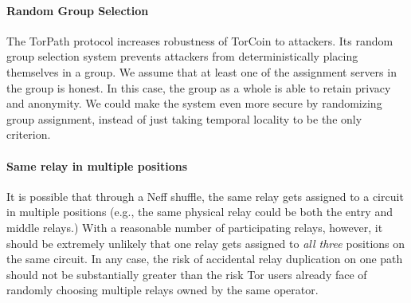 {\paragraph{Random Group Selection} The TorPath protocol increases
robustness of TorCoin to attackers. Its random group selection system prevents
attackers from deterministically placing themselves in a group. We assume that
at least one of the assignment servers in the group is honest. In this case,
the group as a whole is able to retain privacy and anonymity. We could make
the system even more secure by randomizing group assignment, instead of just
taking temporal locality to be the only criterion.

\paragraph{Same relay in multiple positions}  It is possible that through
a Neff shuffle, the same relay gets assigned to a circuit in multiple
positions (e.g., the same physical relay could be both the entry and middle
relays.) With a reasonable number of participating relays, however,
it should be extremely unlikely that one relay gets assigned
to {\em all three} positions on the same circuit.
In any case, the risk of accidental relay duplication on one path
should not be substantially greater than the risk
Tor users already face of randomly choosing multiple relays
owned by the same operator.






}
